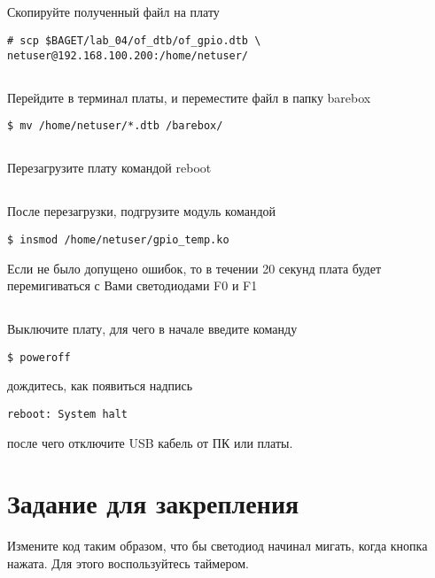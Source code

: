 \subsection{}Скопируйте полученный файл на плату
\begin{lstlisting}[style=bash]
# scp $BAGET/lab_04/of_dtb/of_gpio.dtb \
netuser@192.168.100.200:/home/netuser/
\end{lstlisting}

\subsection{}Перейдите в терминал платы, и переместите файл в папку barebox
\begin{lstlisting}[style=bash]
$ mv /home/netuser/*.dtb /barebox/
\end{lstlisting}

\subsection{}Перезагрузите плату командой reboot

\subsection{}После перезагрузки, подгрузите модуль командой
\begin{lstlisting}[style=bash]
$ insmod /home/netuser/gpio_temp.ko
\end{lstlisting}
Если не было допущено ошибок, то в течении 20 секунд плата будет перемигиваться с Вами светодиодами F0 и F1

\subsection{} Выключите плату, для чего в начале введите команду
\begin{lstlisting}[style=bash]
	$ poweroff
\end{lstlisting}
дождитесь, как появиться надпись
\begin{lstlisting}[style=stdout]
	reboot: System halt
\end{lstlisting}
после чего отключите USB кабель от ПК или платы. 

\section{Задание для закрепления}
Измените код таким образом, что бы светодиод начинал мигать, когда кнопка нажата. Для этого воспользуйтесь таймером.

